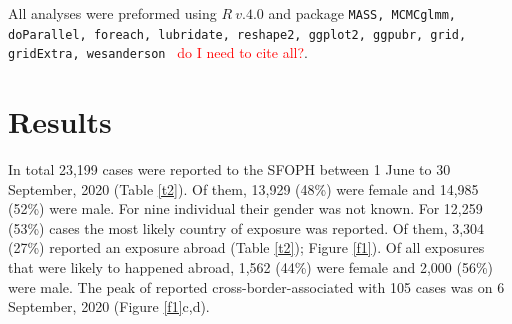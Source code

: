 \documentclass[10pt, a4paper, twoside]{article}
\begin{document}
\begin{multicols}{2}
All analyses were preformed using $R ~v.4.0$ and package \texttt{MASS, MCMCglmm, doParallel, foreach, lubridate, reshape2, ggplot2, ggpubr, grid, gridExtra, wesanderson } \textcolor{red}{do I need to cite all?}.\cite{r_core_team_r_2020,venables_modern_2002}

\section{Results}
In total 23,199 cases were reported to the SFOPH between 1 June to 30 September, 2020 (Table \ref{t2}). 
Of them, 13,929 (48\%) were female and 14,985 (52\%) were male.
For nine individual their gender was not known.
For 12,259 (53\%) cases the most likely country of exposure was reported.
Of them, 3,304 (27\%) reported an exposure abroad (Table \ref{t2}); Figure \ref{f1}).
Of all exposures that were likely to happened abroad, 1,562 (44\%) were female and 2,000 (56\%) were male.
The peak of reported cross-border-associated with 105 cases was on 6 September, 2020 (Figure \ref{f1}c,d).

\end{multicols}
\begin{landscape}
\global\pdfpageattr\expandafter{\the\pdfpageattr/Rotate 90}
}
\end{landscape}
\end{document}
